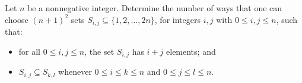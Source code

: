 Let $n$ be a nonnegative integer. Determine the number of ways that one can choose $(n+1)^2$ sets $S_{i,j}\subseteq\{1,2,\ldots,2n\}$, for integers $i,j$ with $0\leq i,j\leq n$, such that:
\begin{itemize}
	\item for all $0\leq i,j\leq n$, the set $S_{i,j}$ has $i+j$ elements; and
	\item $S_{i,j}\subseteq S_{k,l}$ whenever $0\leq i\leq k\leq n$ and $0\leq j\leq l\leq n$.
\end{itemize}